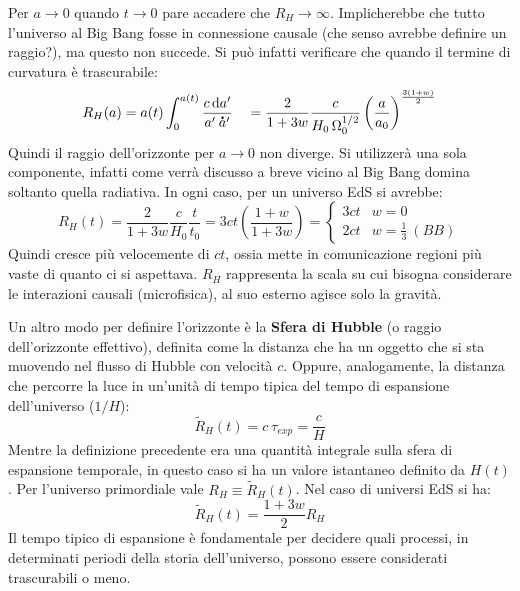 Per $a \rightarrow 0$ quando $ t \rightarrow 0$ pare accadere che $R_H \rightarrow \infty$. Implicherebbe che tutto l'universo al Big Bang fosse in connessione causale (che senso avrebbe definire un raggio?), ma questo non succede. Si può infatti verificare che quando il termine di curvatura è trascurabile:
\begin{equation*}
    R_H (a) = a(t) \int_0^{a(t)} \frac{c\, \mathrm{d}a'}{a' \: \accentset{\mbox{\large\bfseries .}}{a}'} \quad = \frac{2}{1+3w} \frac{c}{H_0\, \Omega_0^{1/2}} \left ( \frac{a}{a_0} \right)^{\frac{3(1+w)}{2}}
\end{equation*}
Quindi il raggio dell'orizzonte per $a \rightarrow 0$ non diverge. Si utilizzerà una sola componente, infatti come verrà discusso a breve vicino al Big Bang domina soltanto quella radiativa. In ogni caso, per un universo EdS si avrebbe:
\begin{equation}
    R_H (t) = \frac{2}{1+3w}\frac{c}{H_0}\frac{t}{t_0} = 3ct \left ( \frac{1+w}{ 1+3w} \right )= \left\{\begin{matrix}
3ct & w=0\\ 
2ct & w=\frac{1}{3}\: (BB)
\end{matrix}\right.
\end{equation}
Quindi cresce più velocemente di $ct$, ossia mette in comunicazione regioni più vaste di quanto ci si aspettava. $R_H$ rappresenta la scala su cui bisogna considerare le interazioni causali (microfisica), al suo esterno agisce solo la gravità.

Un altro modo per definire l'orizzonte è la \textbf{Sfera di Hubble} (o raggio dell'orizzonte effettivo), definita come la distanza che ha un oggetto che si sta muovendo nel flusso di Hubble con velocità $c$. Oppure, analogamente, la distanza che percorre la luce in un'unità di tempo tipica del tempo di espansione dell'universo ($1/H$): 
\begin{equation}
    \tilde{R}_H (t) = c\: \tau_{exp} = \frac{c}{H}
\end{equation}
Mentre la definizione precedente era una quantità integrale sulla sfera di espansione temporale, in questo caso si ha un valore istantaneo definito da $H(t)$. Per l'universo primordiale vale $R_H \equiv \tilde{R}_H (t)$. Nel caso di universi EdS si ha:
\begin{equation*}
    \tilde{R}_H (t) =  \frac{1+3w}{2} R_H
\end{equation*}
Il tempo tipico di espansione è fondamentale per decidere quali processi, in determinati periodi della storia dell'universo, possono essere considerati trascurabili o meno.

